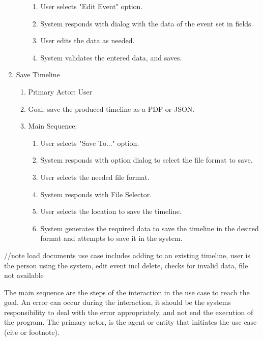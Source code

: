 \begin{enumerate}
\begin{enumerate}
\begin{enumerate}
		\item User selects "Edit Event" option.
		\item System responds with dialog with the data of the event set in fields.
		\item User edits the data as needed.
		\item System validates the entered data, and saves.
	\end{enumerate}
     \end{enumerate}
   \item Save Timeline
    \begin{enumerate}
	\item Primary Actor: User
	\item Goal: save the produced timeline as a PDF or JSON.
	\item Main Sequence:
	\begin{enumerate}
		\item User selects "Save To..." option.
		\item System responds with option dialog to select the file format to save.
		\item User selects the needed file format.
		\item System responds with File Selector.
		\item User selects the location to save the timeline.
		\item System generates the required data to save the timeline in the desired format and attempts to save it in the system.
	\end{enumerate}
    \end{enumerate}
\end{enumerate}
//note load documents use case includes adding to an existing timeline, user is the person using the system, edit event incl delete, checks for invalid data, file not available
\par The main sequence are the steps of the interaction in the use case to reach the goal. An error can occur during the interaction, it should be the systems responsibility to deal with the error appropriately, and not end the execution of the program. The primary actor, is the agent or entity that initiates the use case (cite or footnote).
